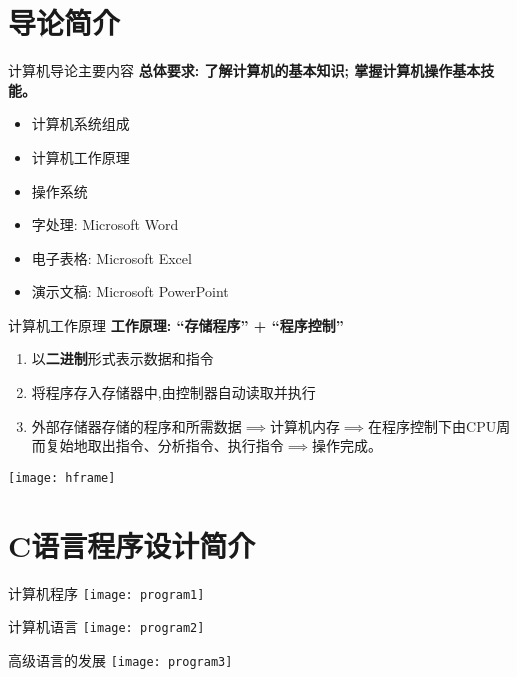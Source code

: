 \section{导论简介}

\begin{frame}{计算机导论主要内容}
\textbf{总体要求: 了解计算机的基本知识; 掌握计算机操作基本技能。}\\
\begin{itemize}
	\item 计算机系统组成
	\item 计算机工作原理
	\item 操作系统
	\item 字处理: Microsoft Word
	\item 电子表格: Microsoft Excel
	\item 演示文稿: Microsoft PowerPoint
\end{itemize}
\end{frame}

\begin{frame}{计算机工作原理}
\textbf{工作原理: ``存储程序'' + ``程序控制''}
\begin{enumerate}
	\item 以\textbf{二进制}形式表示数据和指令
	\item 将程序存入存储器中,由控制器自动读取并执行
	\item 外部存储器存储的程序和所需数据$\implies$计算机内存$\implies$在程序控制下由CPU周而复始地取出指令、分析指令、执行指令$\implies$操作完成。	
\end{enumerate}
\centering\texttt{[image: hframe]}
\end{frame}

\section{C语言程序设计简介}

\begin{frame}{计算机程序}
\centering
\texttt{[image: program1]}
\end{frame}

\begin{frame}{计算机语言}
\centering
\texttt{[image: program2]}
\end{frame}

\begin{frame}{高级语言的发展}
\centering
\texttt{[image: program3]}
\end{frame}

